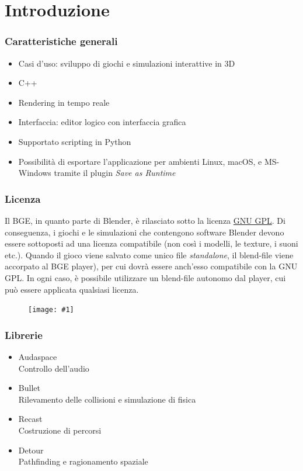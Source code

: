 \documentclass{beamer}
\def\image[#1][#2]{
	\begin{figure}[H]
		\centering
		\texttt{[image: \#1]}
\end{figure}}
\begin{document}
	\section{Introduzione}
		\begin{frame}
			\frametitle{Caratteristiche generali}
			\begin{itemize}
				\item Casi d'uso: sviluppo di giochi e simulazioni interattive in 3D 
				\item C++
				\item Rendering in tempo reale
				\item Interfaccia: editor logico con interfaccia grafica 
				\item Supportato scripting in Python
				\item Possibilità di esportare l'applicazione per ambienti Linux, macOS, e MS-Windows tramite il plugin \textit{Save as Runtime}
			\end{itemize}
		\end{frame}
		\begin{frame}
			\frametitle{Licenza}
			Il BGE, in quanto parte di Blender, è rilasciato sotto la licenza \hyperlink{https://www.gnu.org/licenses/gpl-3.0.en.html}{\textcolor{BlenderOrange}{GNU GPL}}. Di conseguenza, i giochi e le simulazioni che contengono software Blender devono essere sottoposti ad una licenza compatibile (non così i modelli, le texture, i suoni etc.).
			Quando il gioco viene salvato come unico file \textit{standalone}, il blend-file viene accorpato al BGE player), per cui dovrà essere anch'esso compatibile con la GNU GPL. In ogni caso, è possibile utilizzare un blend-file autonomo dal player, cui può essere applicata qualsiasi licenza.
			\image[images/gpl.png][scale=0.4]
		\end{frame}
		\begin{frame}
			\frametitle{Librerie}
			\begin{itemize}
				\item Audaspace \\ {\footnotesize\hspace{1em} Controllo dell'audio}
				\item Bullet \\ {\footnotesize\hspace{1em} Rilevamento delle collisioni e simulazione di fisica} 
				\item Recast \\ {\footnotesize\hspace{1em} Costruzione di percorsi}
				\item Detour \\ {\footnotesize\hspace{1em} Pathfinding e ragionamento spaziale}
			\end{itemize}
		\end{frame}
\end{document}
